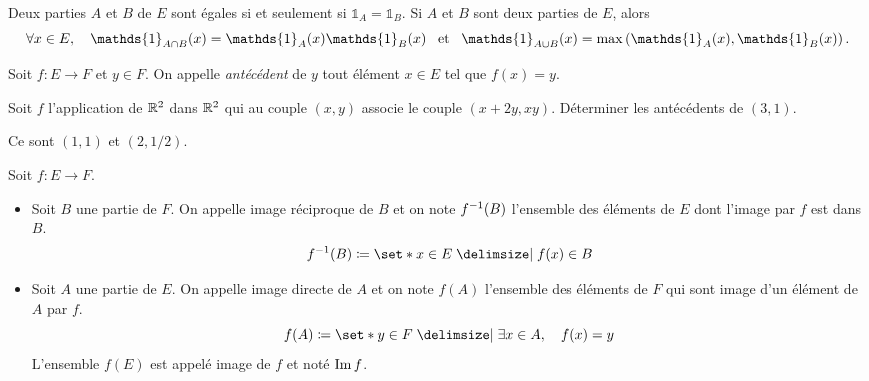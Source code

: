 \documentclass{magnoliaold}
\begin{document}
\begin{remarques}
\remarque Deux parties $A$ et $B$ de $E$ sont égales si et seulement si $\mathds{1}_{A}=\mathds{1}_{B}$.
\remarque Si $A$ et $B$ sont deux parties de $E$, alors
  \[\forall x\in E\qsep \mathds{1}_{A\cap B}(x)=\mathds{1}_{A}(x)\mathds{1}_{B}(x) \et \mathds{1}_{A\cup B}(x)=\max\p{\mathds{1}_{A}(x), \mathds{1}_{B}(x)}.\]
\end{remarques}



\begin{definition}[utile=-3]
Soit $f:E\to F$ et $y\in F$. On appelle \emph{antécédent} de $y$ tout élément $x\in E$
tel que $f(x)=y$.  
\end{definition}


\begin{exoUnique}
\exo Soit $f$ l'application de $\mathbb{R}^2$ dans $\mathbb{R}^2$ qui au couple $(x,y)$
  associe le couple $(x+2y,xy)$. Déterminer les antécédents de $(3,1)$.
  \begin{sol}
  Ce sont $(1,1)$ et $(2,1/2)$.
  \end{sol}
\end{exoUnique}

\begin{definition}[utile=-3]
Soit $f:E\to F$.
\begin{itemize}
\item Soit $B$ une partie de $F$. On appelle image réciproque de $B$
  et on note $f^{-1} (B)$ l'ensemble des éléments de $E$
  dont l'image par $f$ est dans $B$.
  \[f^\applirec (B)\defeq\enstq{x\in E}{f(x)\in B}\]
\item Soit $A$ une partie de $E$. On appelle image directe de $A$ 
  et on note $f(A)$ l'ensemble des éléments de $F$ qui sont
  image d'un élément de $A$ par $f$.
  \[f(A)\defeq\enstq{y\in F}{\exists x\in A \qsep f(x)=y}\]  
  L'ensemble $f(E)$ est appelé image de $f$ et noté $\operatorname{Im} f$.
\end{itemize}
\end{definition}
\end{document}
